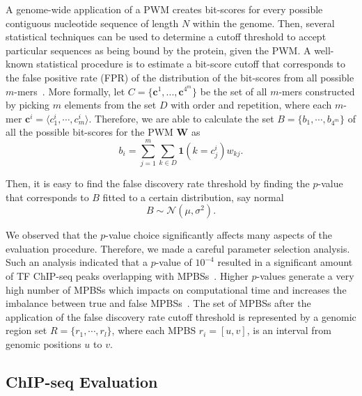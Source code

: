 A genome-wide application of a PWM creates bit-scores for every possible contiguous nucleotide sequence of length $ N $ within the genome. Then, several statistical techniques can be used to determine a cutoff threshold to accept particular sequences as being bound by the protein, given the PWM. A well-known statistical procedure is to estimate a bit-score cutoff that corresponds to the false positive rate (FPR) of the distribution of the bit-scores from all possible $m$-mers~\citep{wilczynski2009}. More formally, let $C = \{\mathbf{c}^{1}, ..., \mathbf{c}^{4^m}\}$ be the set of all $m$-mers constructed by picking $ m $ elements from the set $ D $ with order and repetition, where each $m$-mer $\mathbf{c}^{i} = \langle{c}^{i}_{1}, \cdots, {c}^{i}_{m}\rangle$. Therefore, we are able to calculate the set $ B = \{ {b}_{1}, \cdots, {b}_{4^m} \} $ of all the possible bit-scores for the PWM $\mathbf{W}$ as
\begin{equation}
  \label{eq:pwm.cutoff1}
  {b}_{i} = \sum_{j=1}^{m} \sum_{k \in D} {\mathbf{1}}(k={c}^{i}_{j}){w}_{kj}.
\end{equation}

Then, it is easy to find the false discovery rate threshold by finding the $p$-value that corresponds to $ B $ fitted to a certain distribution, say normal
\begin{equation}
  \label{eq:pwm.cutoff2}
  B \sim \mathcal{N}({\mu},{\sigma}^{2}).
\end{equation}

We observed that the $p$-value choice significantly affects many aspects of the evaluation procedure. Therefore, we made a careful parameter selection analysis. Such an analysis indicated that a $p$-value of $10^{-4}$ resulted in a significant amount of TF ChIP-seq peaks overlapping with MPBSs~\citep{gusmao2014}. Higher $p$-values generate a very high number of MPBSs which impacts on computational time and increases the imbalance between true and false MPBSs~\citep{gusmao2014}. The set of MPBSs after the application of the false discovery rate cutoff threshold is represented by a genomic region set $R = \{ {r}_{1}, \cdots, {r}_{l} \}$, where each MPBS $r_i = [u,v]$, is an interval from genomic positions $u$ to $v$.

\subsection{ChIP-seq Evaluation}
\label{sec:chipseq.evaluation}

